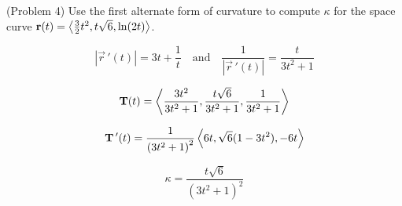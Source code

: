 \documentclass[handout]{ximera}
\begin{document}
\begin{problem}(Problem 4)
Use the first alternate form of curvature to compute $\kappa$ for the space curve $\mathbf r(t) = \left\langle \frac32 t^2, t\sqrt 6 , \ln(2t)\right\rangle$.


\begin{hint}
\[
\left|\vec r\,'(t) \right| = 3t + \frac{1}{t}  \quad \text{and} \quad \frac{1}{\left|\vec r\,'(t) \right|} = \frac{t}{3t^2 + 1}
\]
\end{hint}

\begin{hint}
\[
\mathbf T(t) = \left\langle \frac{3t^2}{3t^2 +1},\frac{t\sqrt 6}{3t^2 +1} , \frac{1}{3t^2 +1}\right\rangle
\]
\end{hint}

\begin{hint}
\[
\mathbf T\,'(t) = \frac{1}{\left(3t^2 +1\right)^2} \left\langle 6t, \sqrt 6 (1 - 3t^2), -6t\right\rangle
\]
\end{hint}

\begin{hint}
\[
\kappa = \frac{t\sqrt 6}{\left(3t^2 +1\right)^2}
\]
\end{hint}

\end{problem}
\end{document}
